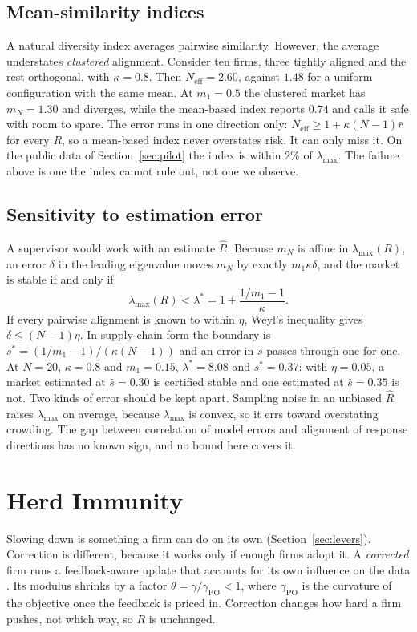 \documentclass[conference]{IEEEtran}
\theoremstyle{definition}
\newcommand{\Neff}{N_{\mathrm{eff}}}
\newcommand{\lmax}{\lambda_{\max}}
\newcommand{\gPO}{\gamma_{\mathrm{PO}}}
\begin{document}
\subsection{Mean-similarity indices}\label{sec:meansim}
A natural diversity index averages pairwise similarity. However, the average
understates \emph{clustered} alignment. Consider ten firms, three tightly
aligned and the rest orthogonal, with $\kappa = 0.8$. Then $\Neff = 2.60$,
against $1.48$ for a uniform configuration with the same mean. At $m_1 = 0.5$
the clustered market has $m_N = 1.30$ and diverges, while the mean-based index
reports $0.74$ and calls it safe with room to spare. The error runs in one
direction only: $\Neff \ge 1 + \kappa(N-1)\bar{r}$ for every $R$, so a
mean-based index never overstates risk. It can only miss it. On the public
data of Section~\ref{sec:pilot} the index is within $2\%$ of $\lmax$. The
failure above is one the index cannot rule out, not one we observe.

\subsection{Sensitivity to estimation error}\label{sec:sens}
A supervisor would work with an estimate $\hat{R}$. Because $m_N$ is affine in
$\lmax(R)$, an error $\delta$ in the leading eigenvalue moves $m_N$ by exactly
$m_1\kappa\delta$, and the market is stable if and only if
\begin{equation}
  \lmax(R) < \lambda^{*} = 1 + \frac{1/m_1 - 1}{\kappa}.
  \label{eq:lstar}
\end{equation}
If every pairwise alignment is known to within $\eta$, Weyl's inequality gives
$\delta \le (N-1)\eta$. In supply-chain form the boundary is
$s^{*} = (1/m_1 - 1)/(\kappa(N-1))$ and an error in $s$ passes through one for
one. At $N=20$, $\kappa=0.8$ and $m_1=0.15$, $\lambda^{*}=8.08$ and
$s^{*}=0.37$: with $\eta = 0.05$, a market estimated at $\hat{s}=0.30$ is
certified stable and one estimated at $\hat{s}=0.35$ is not. Two kinds of
error should be kept apart. Sampling noise in an unbiased $\hat{R}$ raises
$\lmax$ on average, because $\lmax$ is convex, so it errs toward overstating
crowding. The gap between correlation of model errors and alignment of
response directions has no known sign, and no bound here covers it.

\section{Herd Immunity}\label{sec:herd}
Slowing down is something a firm can do on its own
(Section~\ref{sec:levers}). Correction is different, because it works only if
enough firms adopt it. A \emph{corrected} firm runs a feedback-aware update
that accounts for its own influence on the data \cite{izzo2021,miller2021}.
Its modulus shrinks by a factor $\theta = \gamma/\gPO < 1$, where $\gPO$ is
the curvature of the objective once the feedback is priced in. Correction
changes how hard a firm pushes, not which way, so $R$ is unchanged.
\end{document}
